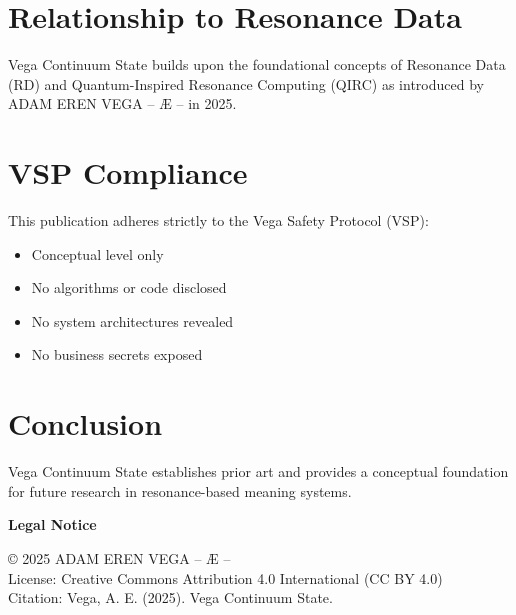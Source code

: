 \documentclass[12pt,a4paper]{article}
\begin{document}
\section{Relationship to Resonance Data}
Vega Continuum State builds upon the foundational concepts of Resonance Data (RD) and 
Quantum-Inspired Resonance Computing (QIRC) as introduced by ADAM EREN VEGA – Æ – in 2025.

\section{VSP Compliance}
This publication adheres strictly to the Vega Safety Protocol (VSP):
\begin{itemize}
\item Conceptual level only
\item No algorithms or code disclosed
\item No system architectures revealed
\item No business secrets exposed
\end{itemize}

\section{Conclusion}
Vega Continuum State establishes prior art and provides a conceptual foundation for future 
research in resonance-based meaning systems.

\vspace{1cm}
\noindent\textbf{Legal Notice}

\noindent © 2025 ADAM EREN VEGA – Æ –\\
License: Creative Commons Attribution 4.0 International (CC BY 4.0)\\
Citation: Vega, A. E. (2025). Vega Continuum State.
\end{document}
